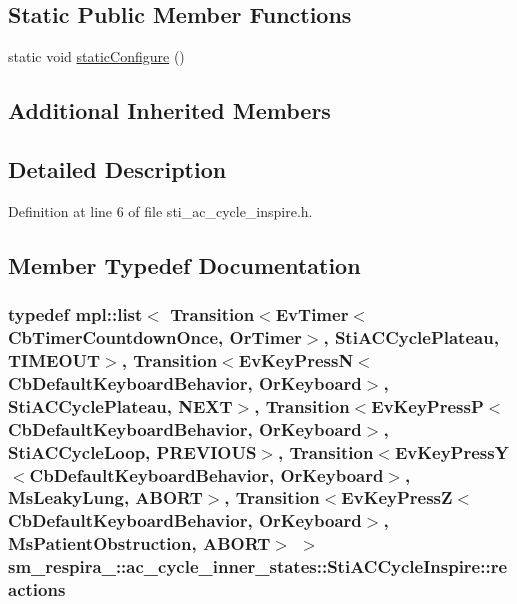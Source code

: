 \subsection*{Static Public Member Functions}
\begin{DoxyCompactItemize}
\item 
static void \hyperlink{structsm__respira__1_1_1ac__cycle__inner__states_1_1StiACCycleInspire_a38811ba8361878a910367f1bffe34a12}{static\+Configure} ()
\end{DoxyCompactItemize}
\subsection*{Additional Inherited Members}


\subsection{Detailed Description}


Definition at line 6 of file sti\+\_\+ac\+\_\+cycle\+\_\+inspire.\+h.



\subsection{Member Typedef Documentation}
\subsubsection[{\texorpdfstring{reactions}{reactions}}]{\setlength{\rightskip}{0pt plus 5cm}typedef mpl\+::list$<$ Transition$<$Ev\+Timer$<$Cb\+Timer\+Countdown\+Once, {\bf Or\+Timer}$>$, {\bf Sti\+A\+C\+Cycle\+Plateau}, {\bf T\+I\+M\+E\+O\+UT}$>$, Transition$<$Ev\+Key\+PressN$<$Cb\+Default\+Keyboard\+Behavior, {\bf Or\+Keyboard}$>$, {\bf Sti\+A\+C\+Cycle\+Plateau}, {\bf N\+E\+XT}$>$, Transition$<$Ev\+Key\+PressP$<$Cb\+Default\+Keyboard\+Behavior, {\bf Or\+Keyboard}$>$, {\bf Sti\+A\+C\+Cycle\+Loop}, {\bf P\+R\+E\+V\+I\+O\+US}$>$, Transition$<$Ev\+Key\+PressY$<$Cb\+Default\+Keyboard\+Behavior, {\bf Or\+Keyboard}$>$, {\bf Ms\+Leaky\+Lung}, {\bf A\+B\+O\+RT}$>$, Transition$<$Ev\+Key\+PressZ$<$Cb\+Default\+Keyboard\+Behavior, {\bf Or\+Keyboard}$>$, {\bf Ms\+Patient\+Obstruction}, {\bf A\+B\+O\+RT}$>$ $>$ {\bf sm\+\_\+respira\+\_\+::ac\+\_\+cycle\+\_\+inner\+\_\+states\+::\+Sti\+A\+C\+Cycle\+Inspire\+::reactions}}\hypertarget{structsm__respira__1_1_1ac__cycle__inner__states_1_1StiACCycleInspire_ab4fe7e4f91d31c956264fd09e571440f}{}\label{structsm__respira__1_1_1ac__cycle__inner__states_1_1StiACCycleInspire_ab4fe7e4f91d31c956264fd09e571440f}


